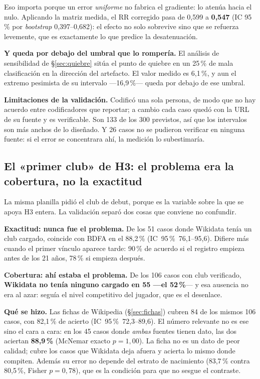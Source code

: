 \documentclass[11pt,a4paper]{article}
\newcommand{\ic}[2]{\mbox{IC 95\,\% #1--#2}}
\begin{document}
Eso importa porque un error \emph{uniforme} no fabrica el gradiente: lo atenúa
hacia el nulo. Aplicando la matriz medida, el RR corregido pasa de 0,599 a
\textbf{0,547} (IC 95\,\% por \emph{bootstrap} 0,397--0,682): el efecto no solo
sobrevive sino que se refuerza levemente, que es exactamente lo que predice la
desatenuación.

\textbf{Y queda por debajo del umbral que lo rompería.} El análisis de
sensibilidad de §\ref{sec:quiebre} sitúa el punto de quiebre en un 25\,\% de mala
clasificación en la dirección del artefacto. El valor medido es 6,1\,\%, y aun el
extremo pesimista de su intervalo —16,9\,\%— queda por debajo de ese umbral.

\textbf{Limitaciones de la validación.} Codificó una sola persona, de modo que no
hay acuerdo entre codificadores que reportar; a cambio cada caso quedó con la URL
de su fuente y es verificable. Son 133 de los 300 previstos, así que los
intervalos son más anchos de lo diseñado. Y 26 casos no se pudieron verificar en
ninguna fuente: si el error se concentrara ahí, la medición lo subestimaría.

\subsection{El «primer club» de H3: el problema era la cobertura, no la exactitud}
\label{sec:validacionclub}

La misma planilla pidió el club de debut, porque es la variable sobre la que se
apoya H3 entera. La validación separó dos cosas que conviene no confundir.

\textbf{Exactitud: nunca fue el problema.} De los 51 casos donde Wikidata tenía
un club cargado, coincide con BDFA en el 88,2\,\% (\ic{76,1}{95,6}). Difiere más
cuando el primer vínculo aparece tarde: 90\,\% de acuerdo si el registro empieza
antes de los 21 años, 78\,\% si empieza después.

\textbf{Cobertura: ahí estaba el problema.} De los 106 casos con club verificado,
\textbf{Wikidata no tenía ninguno cargado en 55 —el 52\,\%}— y esa ausencia no
era al azar: seguía el nivel competitivo del jugador, que es el desenlace.

\textbf{Qué se hizo.} Las fichas de Wikipedia (§\ref{sec:fichas}) cubren 84 de
los mismos 106 casos, con 82,1\,\% de acierto (\ic{72,3}{89,6}). El número
relevante no es ese sino el cara a cara: en los 45 casos donde \emph{ambas}
fuentes tienen dato, las dos aciertan \textbf{88,9\,\%} (McNemar exacto $p =
1{,}00$). La ficha no es un dato de peor calidad; cubre los casos que Wikidata
deja afuera y acierta lo mismo donde compiten. Además su error no depende del
estrato de nacimiento (83,7\,\% contra 80,5\,\%, Fisher $p = 0{,}78$), que es la
condición para que no sesgue el contraste.
\end{document}
